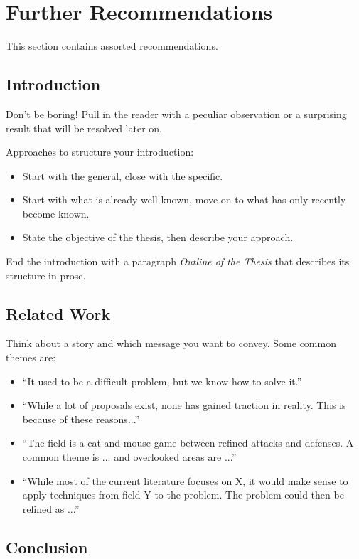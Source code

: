  
\chapter{Further Recommendations}

This section contains assorted recommendations.

\section{Introduction}

Don’t be boring! Pull in the reader with a peculiar observation or a surprising result that will be resolved later on.

Approaches to structure your introduction:
\begin{itemize}
\item Start with the general, close with the specific.
\item Start with what is already well-known, move on to what has only recently become known.
\item State the objective of the thesis, then describe your approach.
\end{itemize}

End the introduction with a paragraph \emph{Outline of the Thesis} that describes its structure in prose.

\section{Related Work}

Think about a story and which message you want to convey. Some common themes are:
\begin{itemize}
\item “It used to be a difficult problem, but we know how to solve it.”
\item “While a lot of proposals exist, none has gained traction in reality. This is because of these reasons...”
\item “The field is a cat-and-mouse game between refined attacks and defenses. A common theme is ... and overlooked areas are ...”
\item “While most of the current literature focuses on X, it would make sense to apply techniques from field Y to the problem. The problem could then be refined as ...”
\end{itemize}

\section{Conclusion}

